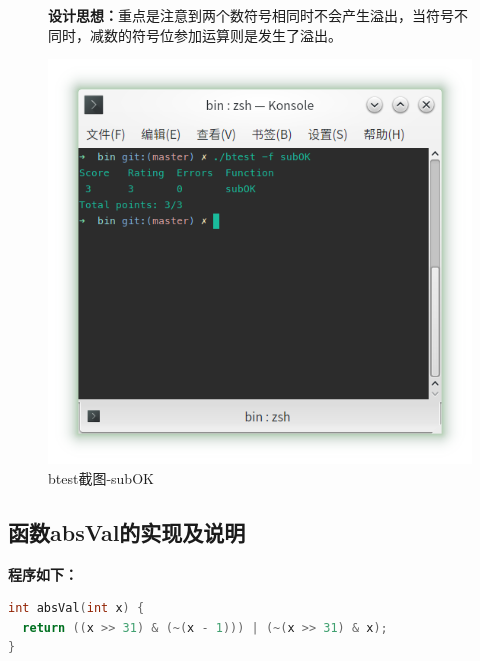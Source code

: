 \begin{figure}[H]
    \begin{minipage}[c]{0.5\linewidth}
        \textbf{设计思想：}重点是注意到两个数符号相同时不会产生溢出，当符号不同时，减数的符号位参加运算则是发生了溢出。
    \end{minipage}
    \begin{minipage}[c]{0.4\linewidth}
        \centering
        \includegraphics[width=0.9\linewidth]{figures/subOK}
        \caption{btest截图-subOK}
        \label{fig:subOK}
    \end{minipage}
\end{figure}

\subsection{函数absVal的实现及说明}
\textbf{程序如下：}

\begin{lstlisting}[language = c]
int absVal(int x) {
  return ((x >> 31) & (~(x - 1))) | (~(x >> 31) & x);
}
\end{lstlisting}

